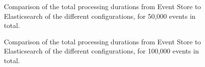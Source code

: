 \begin{figure}[h]
        \caption{Comparison of the total processing durations from Event Store to Elasticsearch of the different configurations, for 50,000 events in total.}
        \label{fig:evaluation:performance:mean-durations-50k}
\end{figure}

\begin{figure}[h]
        \caption{Comparison of the total processing durations from Event Store to Elasticsearch of the different configurations, for 100,000 events in total.}
        \label{fig:evaluation:performance:mean-durations-100k}
\end{figure}

